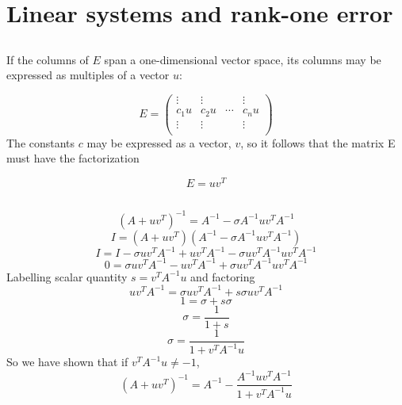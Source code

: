 \documentclass[11pt]{article} %
\begin{document}
\section{Linear systems and rank-one error}
\subsection{} %
If the columns of $E$ span a one-dimensional vector space, its columns may be expressed as multiples of a vector $u$:

\begin{equation}
E=
 \begin{pmatrix}
  \vdots  & \vdots  & & \vdots  \\
  c_1 u & c_2 u & \cdots & c_n u \\
  \vdots  & \vdots  &   & \vdots  \\
 \end{pmatrix}
\end{equation}
The constants $c$ may be expressed as a vector, $v$, so it follows that the matrix E must have the factorization

\begin{equation}
E= u v^T
\end{equation}

\subsection{} %

\begin{equation}
\left ( A + uv^T \right ) ^{-1} = A^{-1} - \sigma A^{-1} u v^T A^{-1}
\label{eq:inverse}
\end{equation}
\begin{equation}
I = \left ( A + uv^T \right ) \left ( A^{-1} - \sigma A^{-1} u v^T A^{-1} \right )
\end{equation}
\begin{equation}
I = I - \sigma u v^T A^{-1}+u v^T A^{-1} - \sigma  u v^T A^{-1} u v^{T} A^{-1}
\end{equation}
\begin{equation}
0 =  \sigma u v^T A^{-1} - u v^T A^{-1} + \sigma  u v^T A^{-1} u v^{T} A^{-1}
\end{equation}
Labelling scalar quantity $s = v^T A^{-1} u $ and factoring
\begin{equation}
u v^T A^{-1}  =  \sigma u v^T A^{-1}   +s \sigma  u v^{T} A^{-1}
\end{equation}
\begin{equation}
1  =  \sigma  +s \sigma 
\end{equation}
\begin{equation}
 \sigma  = \frac{1}{1+s}
\label{eq:sigma}
\end{equation}
\begin{equation}
 \boxed{\sigma  =  \frac{1}{1+v^T A^{-1} u}}
\label{eq:sigma}
\end{equation}
So we have shown that if $v^T A^{-1} u \ne -1$, 
\begin{equation}
\boxed{\left ( A + uv^T \right ) ^{-1} = A^{-1} - \frac{A^{-1} u v^T A^{-1}}{1+v^T A^{-1} u}}
\end{equation}
\end{document}
